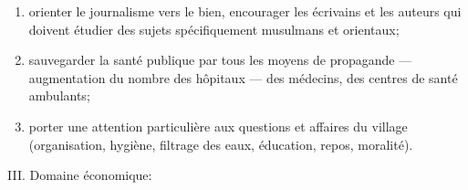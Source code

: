 \begin{enumerate}
\item
   
  orienter le journalisme vers le bien, encourager les écri­vains et les
  auteurs qui doivent étudier des sujets spécifiquement musulmans et
  orientaux;
   
\item
   
  sauvegarder la santé publique par tous les moyens de propagande ---
  augmentation du nombre des hôpitaux --- des médecins, des centres de
  santé ambulants;
   
\item
   
  porter une attention particulière aux questions et affaires du village
  (organisation, hygiène, filtrage des eaux, éducation, repos,
  moralité).
   
\end{enumerate}

 
III. Domaine économique:
 

